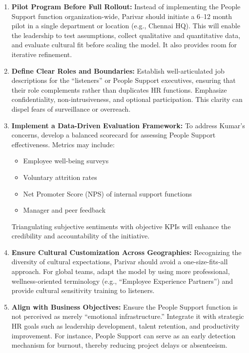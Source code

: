 \documentclass[10pt,a4paper]{book}
\begin{document}
\begin{enumerate}
    \item \textbf{Pilot Program Before Full Rollout:} 
    Instead of implementing the People Support function organization-wide, Parivar should initiate a 6–12 month pilot in a single department or location (e.g., Chennai HQ). This will enable the leadership to test assumptions, collect qualitative and quantitative data, and evaluate cultural fit before scaling the model. It also provides room for iterative refinement.

    \item \textbf{Define Clear Roles and Boundaries:}
    Establish well-articulated job descriptions for the “listeners” or People Support executives, ensuring that their role complements rather than duplicates HR functions. Emphasize confidentiality, non-intrusiveness, and optional participation. This clarity can dispel fears of surveillance or overreach.

    \item \textbf{Implement a Data-Driven Evaluation Framework:}
    To address Kumar’s concerns, develop a balanced scorecard for assessing People Support effectiveness. Metrics may include:
    \begin{itemize}
        \item Employee well-being surveys
        \item Voluntary attrition rates
        \item Net Promoter Score (NPS) of internal support functions
        \item Manager and peer feedback
    \end{itemize}
    Triangulating subjective sentiments with objective KPIs will enhance the credibility and accountability of the initiative.

    \item \textbf{Ensure Cultural Customization Across Geographies:}
    Recognizing the diversity of cultural expectations, Parivar should avoid a one-size-fits-all approach. For global teams, adapt the model by using more professional, wellness-oriented terminology (e.g., “Employee Experience Partners”) and provide cultural sensitivity training to listeners.

    \item \textbf{Align with Business Objectives:}
    Ensure the People Support function is not perceived as merely “emotional infrastructure.” Integrate it with strategic HR goals such as leadership development, talent retention, and productivity improvement. For instance, People Support can serve as an early detection mechanism for burnout, thereby reducing project delays or absenteeism.


\end{enumerate}
\end{document}
